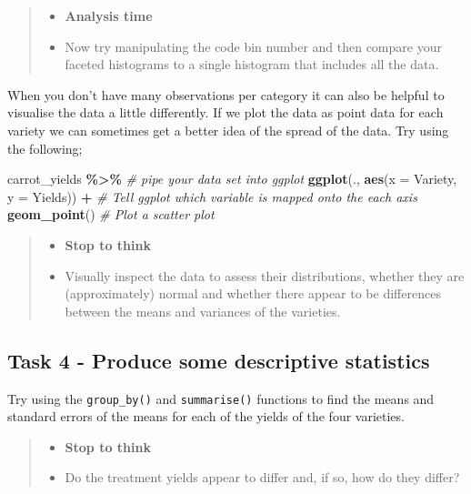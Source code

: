 \documentclass[
]{book}
\newenvironment{Shaded}{\begin{snugshade}}{\end{snugshade}}
\newcommand{\AttributeTok}[1]{\textcolor[rgb]{0.13,0.29,0.53}{#1}}
\newcommand{\CommentTok}[1]{\textcolor[rgb]{0.56,0.35,0.01}{\textit{#1}}}
\newcommand{\FunctionTok}[1]{\textcolor[rgb]{0.13,0.29,0.53}{\textbf{#1}}}
\newcommand{\NormalTok}[1]{#1}
\newcommand{\SpecialCharTok}[1]{\textcolor[rgb]{0.81,0.36,0.00}{\textbf{#1}}}
\providecommand{\tightlist}{%
  \setlength{\itemsep}{0pt}\setlength{\parskip}{0pt}}
\begin{document}
\begin{quote}
\begin{itemize}
\tightlist
\item
  \textbf{Analysis time}
\item
  Now try manipulating the code bin number and then compare your faceted histograms to a single histogram that includes all the data.
\end{itemize}
\end{quote}

When you don't have many observations per category it can also be helpful to visualise the data a little differently. If we plot the data as point data for each variety we can sometimes get a better idea of the spread of the data. Try using the following;

\begin{Shaded}
\begin{Highlighting}[]
\NormalTok{carrot\_yields }\SpecialCharTok{\%\textgreater{}\%} \CommentTok{\# pipe your data set into ggplot}
  \FunctionTok{ggplot}\NormalTok{(., }\FunctionTok{aes}\NormalTok{(}\AttributeTok{x =}\NormalTok{ Variety, }\AttributeTok{y =}\NormalTok{ Yields)) }\SpecialCharTok{+} \CommentTok{\# Tell ggplot which variable is mapped onto the each axis}
  \FunctionTok{geom\_point}\NormalTok{() }\CommentTok{\# Plot a scatter plot}
\end{Highlighting}
\end{Shaded}

\begin{quote}
\begin{itemize}
\tightlist
\item
  \textbf{Stop to think}
\item
  Visually inspect the data to assess their distributions, whether they are (approximately) normal and whether there appear to be differences between the means and variances of the varieties.
\end{itemize}
\end{quote}

\subsection{Task 4 - Produce some descriptive statistics}\label{c5t4}

Try using the \texttt{group\_by()} and \texttt{summarise()} functions to find the means and standard errors of the means for each of the yields of the four varieties.

\begin{quote}
\begin{itemize}
\tightlist
\item
  \textbf{Stop to think}
\item
  Do the treatment yields appear to differ and, if so, how do they differ?
\end{itemize}
\end{quote}
\end{document}

